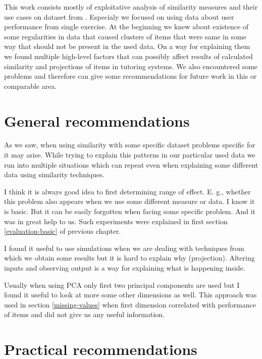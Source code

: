 \documentclass[
  digital, %
  table,   %
  nolof,     %
  nolot,     %
  nocover,
  color,
  final, %
]{fithesis3}
\begin{document}
This work consists mostly of exploitative analysis of similarity measures and their use cases on dataset from \umimeCesky{}. Especialy we focused on using data about user performance from single exercise. At the beginning we knew about existence of some regularities in data that caused clusters of items that were same in some way that should not be present in the used data. On a way for explaining them we found multiple high-level factors that can possibly affect results of calculated similarity and projections of items in tutoring systems. We also encountered some problems and therefore can give some recommendations for future work in this or comparable area.


\section{General recommendations}\label{general-recommendations}

As we saw, when using similarity with some specific dataset problems specific for it may arise. While trying to explain this patterns in our particular used data we run into multiple situations which can repeat even when explaining some different data using similarity techniques.


I think it is always good idea to first determining range of effect. E. g., whether this problem also appears when we use some different measure or data. I know it is basic. But it can be easily forgotten when facing some specific problem. And it was in great help to us. Such experiments were explained in first section \ref{evaluation-basic} of previous chapter.


I found it useful to use simulations when we are dealing with techniques from which we obtain some results but it is hard to explain why (projection). Altering inputs and observing output is a way for explaining what is happening inside.


Usually when using PCA only first two principal components are used but I found it useful to look at more some other dimensions as well. This approach was used in section \ref{missing-values} when first dimension correlated with performance of items and did not give us any useful information.

\section{Practical recommendations}\label{practical-recommendations}
\end{document}

